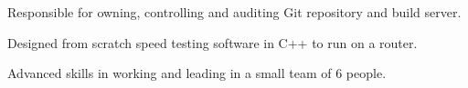 \documentclass[letterpaper]{deedy-resume} %
\begin{document}
\begin{minipage}[t]{0.66\textwidth}
\sectionspace %

%

\vspace{\topsep} %
\begin{tightitemize}
\item Responsible for owning, controlling and auditing Git repository and build server.
\item Designed from scratch speed testing software in C++ to run on a router.
\item Advanced skills in working and leading in a small team of 6 people.
\end{tightitemize}
\vspace{\topsep} %

\sectionspace %


\end{minipage} %








\end{document}
